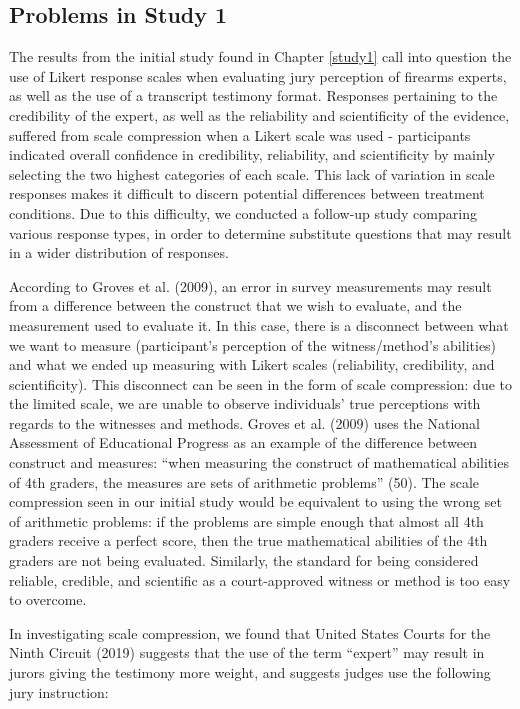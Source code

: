 \documentclass[print]{nuthesis}
\begin{document}
\hypertarget{problems-in-study-1}{%
\subsection{Problems in Study 1}\label{problems-in-study-1}}

The results from the initial study found in Chapter \ref{study1} call into question the use of Likert response scales when evaluating jury perception of firearms experts, as well as the use of a transcript testimony format.
Responses pertaining to the credibility of the expert, as well as the reliability and scientificity of the evidence, suffered from scale compression when a Likert scale was used - participants indicated overall confidence in credibility, reliability, and scientificity by mainly selecting the two highest categories of each scale.
This lack of variation in scale responses makes it difficult to discern potential differences between treatment conditions.
Due to this difficulty, we conducted a follow-up study comparing various response types, in order to determine substitute questions that may result in a wider distribution of responses.

According to Groves et al. (2009), an error in survey measurements may result from a difference between the construct that we wish to evaluate, and the measurement used to evaluate it.
In this case, there is a disconnect between what we want to measure (participant's perception of the witness/method's abilities) and what we ended up measuring with Likert scales (reliability, credibility, and scientificity).
This disconnect can be seen in the form of scale compression: due to the limited scale, we are unable to observe individuals' true perceptions with regards to the witnesses and methods.
Groves et al. (2009) uses the National Assessment of Educational Progress as an example of the difference between construct and measures: ``when measuring the construct of mathematical abilities of 4th graders, the measures are sets of arithmetic problems'' (50).
The scale compression seen in our initial study would be equivalent to using the wrong set of arithmetic problems: if the problems are simple enough that almost all 4th graders receive a perfect score, then the true mathematical abilities of the 4th graders are not being evaluated.
Similarly, the standard for being considered reliable, credible, and scientific as a court-approved witness or method is too easy to overcome.

In investigating scale compression, we found that United States Courts for the Ninth Circuit (2019) suggests that the use of the term ``expert'' may result in jurors giving the testimony more weight, and suggests judges use the following jury instruction:
\end{document}
